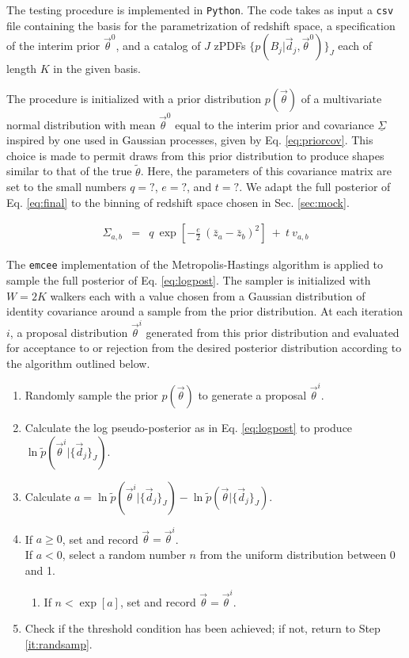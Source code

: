 \documentclass[preprint]{aastex}
\newcommand{\textul}{\underline}
\begin{document}
The testing procedure is implemented in \texttt{Python}.  The code takes as 
input a \texttt{csv} file containing the basis for the parametrization of 
redshift space, a specification of the interim prior $\vec{\theta}^{0}$, and a 
catalog of $J$ zPDFs $\{p(B_{j}|\vec{d}_{j},\vec{\theta}^{0})\}_{J}$ each of 
length $K$ in the given basis.  

The procedure is initialized with a prior distribution $p(\vec{\theta})$ of a 
multivariate normal distribution with mean $\vec{\theta}^{0}$ equal to the 
interim prior and covariance $\textul{\Sigma}$ inspired by one used in Gaussian 
processes, given by Eq. \ref{eq:priorcov}.  This choice is made to permit draws 
from this prior distribution to produce shapes similar to that of the true 
$\tilde{\theta}$.  Here, the parameters of this covariance matrix are set to 
the small numbers $q=?$, $e=?$, and $t=?$.  We adapt the full posterior of Eq. 
\ref{eq:final} to the binning of redshift space chosen in Sec. \ref{sec:mock}.

\begin{eqnarray}
\label{eq:priorcov}
\Sigma_{a,b} &=& q\ \exp[-\frac{e}{2}\ (\bar{z}_{a}-\bar{z}_{b})^{2}]\ +\ t\ 
v_{a,b}
\end{eqnarray}

The \texttt{emcee} implementation of the Metropolis-Hastings algorithm is 
applied to sample the full posterior of Eq. \ref{eq:logpost}.   \citep{for12}   
The sampler is initialized with $W=2K$ walkers each with a value chosen from a 
Gaussian distribution of identity covariance around a sample from the prior 
distribution.  At each iteration $i$, a proposal distribution 
$\vec{\theta}^{i}$ generated from this prior distribution and evaluated for 
acceptance to or rejection from the desired posterior distribution according to 
the algorithm outlined below.  

\begin{enumerate}
\item \label{it:randsamp} Randomly sample the prior $p(\vec{\theta})$ to 
generate a proposal $\vec{\theta}^{i}$.
\item Calculate the log pseudo-posterior as in Eq. \ref{eq:logpost} to produce 
$\ln\tilde{p}(\vec{\theta}^{i}|\{\vec{d}_{j}\}_{J})$.
\item Calculate 
$a=\ln\tilde{p}(\vec{\theta}^{i}|\{\vec{d}_{j}\}_{J})-\ln\tilde{p}(\vec{\theta}|
\{\vec{d}_{j}\}_{J})$.
\item If $a\geq0$, set and record $\vec{\theta}=\vec{\theta}^{i}$.\\
If $a<0$, select a random number $n$ from the uniform distribution between 0 
and 1.
\begin{enumerate}
\item If $n<\exp[a]$, set and record $\vec{\theta}=\vec{\theta}^{i}$.
\end{enumerate}
\item Check if the threshold condition has been achieved; if not, return to 
Step \ref{it:randsamp}.
\end{enumerate}
\end{document}
